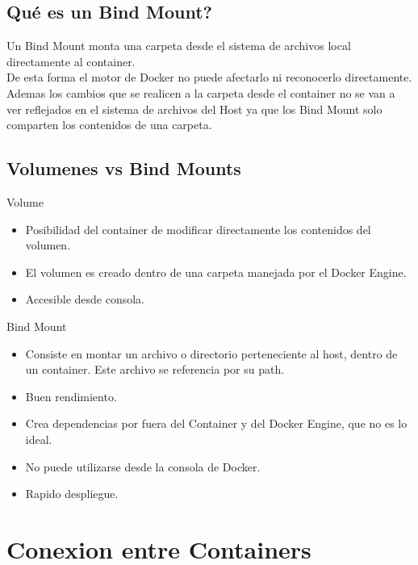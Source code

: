 \documentclass{beamer}
\begin{document}
\subsection{Qué es un Bind Mount?}

\begin{frame}
	Un Bind Mount monta una carpeta desde el sistema de archivos local directamente al container. \\
	De esta forma el motor de Docker no puede afectarlo ni reconocerlo directamente. \\
	\vspace{.3cm}
	Ademas los cambios que se realicen a la carpeta desde el container no se van a ver reflejados en el sistema de archivos
	del Host ya que los Bind Mount solo comparten los contenidos de una carpeta. \\
\end{frame}

\subsection{Volumenes vs Bind Mounts}

\begin{frame}
	Volume
	\begin{itemize}
		\item
		Posibilidad del container de modificar directamente los contenidos del volumen.
		\item
		El volumen es creado dentro de una carpeta manejada por el Docker Engine.
		\item
		Accesible desde consola.
	\end{itemize}
	Bind Mount
	\begin{itemize}
		\item
		Consiste en montar un archivo o directorio perteneciente al host, dentro de un container. Este archivo se referencia por su path.
		\item
		Buen rendimiento.
		\item
		Crea dependencias por fuera del Container y del Docker Engine, que no es lo ideal.
		\item
		No puede utilizarse desde la consola de Docker.
		\item
		Rapido despliegue.
	\end{itemize}
\end{frame}

\section{Conexion entre Containers}
\end{document}
